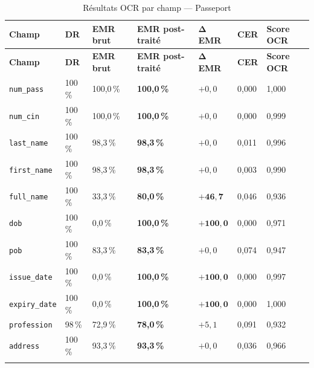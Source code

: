 \renewcommand{\arraystretch}{1.35}
\setlength{\LTleft}{0pt plus 1fill}
\setlength{\LTright}{0pt plus 1fill}
\begin{longtable}{|p{2.8cm}|p{1.3cm}|p{1.8cm}|p{2.5cm}|p{1.8cm}|p{1.3cm}|p{2cm}|}
  \hline
  \rowcolor{bleu_principal!15}
  \textbf{Champ} & \textbf{DR} & \textbf{EMR brut} & \textbf{EMR post-traité} & $\boldsymbol{\Delta}$\textbf{EMR} & \textbf{CER} & \textbf{Score OCR} \\
  \hline
  \endfirsthead
  \hline
  \rowcolor{bleu_principal!15}
  \textbf{Champ} & \textbf{DR} & \textbf{EMR brut} & \textbf{EMR post-traité} & $\boldsymbol{\Delta}$\textbf{EMR} & \textbf{CER} & \textbf{Score OCR} \\
  \hline
  \endhead
  \texttt{num\_pass}    & 100\,\% & 100,0\,\% & \textbf{100,0\,\%} & $+0{,}0$            & 0,000 & 1,000 \\
  \hline
  \texttt{num\_cin}     & 100\,\% & 100,0\,\% & \textbf{100,0\,\%} & $+0{,}0$            & 0,000 & 0,999 \\
  \hline
  \texttt{last\_name}   & 100\,\% & 98,3\,\%  & \textbf{98,3\,\%}  & $+0{,}0$            & 0,011 & 0,996 \\
  \hline
  \texttt{first\_name}  & 100\,\% & 98,3\,\%  & \textbf{98,3\,\%}  & $+0{,}0$            & 0,003 & 0,990 \\
  \hline
  \texttt{full\_name}   & 100\,\% & 33,3\,\%  & \textbf{80,0\,\%}  & $\mathbf{+46{,}7}$  & 0,046 & 0,936 \\
  \hline
  \texttt{dob}          & 100\,\% & 0,0\,\%   & \textbf{100,0\,\%} & $\mathbf{+100{,}0}$ & 0,000 & 0,971 \\
  \hline
  \texttt{pob}          & 100\,\% & 83,3\,\%  & \textbf{83,3\,\%}  & $+0{,}0$            & 0,074 & 0,947 \\
  \hline
  \texttt{issue\_date}  & 100\,\% & 0,0\,\%   & \textbf{100,0\,\%} & $\mathbf{+100{,}0}$ & 0,000 & 0,997 \\
  \hline
  \texttt{expiry\_date} & 100\,\% & 0,0\,\%   & \textbf{100,0\,\%} & $\mathbf{+100{,}0}$ & 0,000 & 1,000 \\
  \hline
  \texttt{profession}   & 98\,\%  & 72,9\,\%  & \textbf{78,0\,\%}  & $+5{,}1$            & 0,091 & 0,932 \\
  \hline
  \texttt{address}      & 100\,\% & 93,3\,\%  & \textbf{93,3\,\%}  & $+0{,}0$            & 0,036 & 0,966 \\
  \hline
  \caption{Résultats OCR par champ --- Passeport}
  \label{tab:ocr-champs-passport}
\end{longtable}

